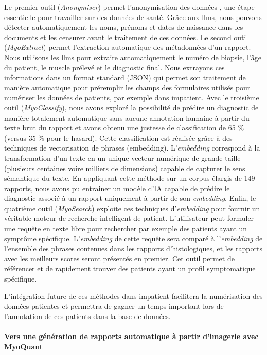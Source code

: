 Le premier outil (\textit{Anonymiser}) permet l’anonymisation des données , une étape essentielle pour travailler sur des données de santé. Grâce aux \gls{llms}, nous pouvons détecter automatiquement les noms, prénoms et dates de naissance dans les documents et les censurer avant le traitement de ces données. Le second outil (\textit{MyoExtract}) permet l’extraction automatique des métadonnées d’un rapport. Nous utilisons les \gls{llms} pour extraire automatiquement le numéro de biopsie, l’âge du patient, le muscle prélevé et le diagnostic final. Nous extrayons ces informations dans un format standard (JSON) qui permet son traitement de manière automatique pour préremplir les champs des formulaires utilisés pour numériser les données de patients, par exemple dans \gls{impatient}. Avec le troisième outil (\textit{MyoClassify}), nous avons exploré la possibilité de prédire un diagnostic de manière totalement automatique sans aucune annotation humaine à partir du texte brut du rapport et avons obtenu une justesse de classification de 65 \% (versus 35 \% pour le hasard). Cette classification est réalisée grâce à des techniques de vectorisation de phrases (embedding). L’\textit{embedding} correspond à la transformation d’un texte en un unique vecteur numérique de grande taille (plusieurs centaines voire milliers de dimensions) capable de capturer le sens sémantique du texte. En appliquant cette méthode sur un corpus élargis de 149 rapports, nous avons pu entrainer un modèle d’IA capable de prédire le diagnostic associé à un rapport uniquement à partir de son \textit{embedding}. Enfin, le quatrième outil (\textit{MyoSearch}) exploite ces techniques d’\textit{embedding} pour fournir un véritable moteur de recherche intelligent de patient. L’utilisateur peut formuler une requête en texte libre pour rechercher par exemple des patients ayant un symptôme spécifique. L’\textit{embedding} de cette requête sera comparé à l’\textit{embedding} de l’ensemble des phrases contenues dans les rapports d’histologiques, et les rapports avec les meilleurs scores seront présentés en premier. Cet outil permet de référencer et de rapidement trouver des patients ayant un profil symptomatique spécifique.

L’intégration future de ces méthodes dans \gls{impatient} facilitera la numérisation des données patientes et permettra de gagner un temps important lors de l’annotation de ces patients dans la base de données.

\paragraph{\textbf{Vers une génération de rapports automatique à partir d’imagerie avec MyoQuant}}\mbox{}\\

